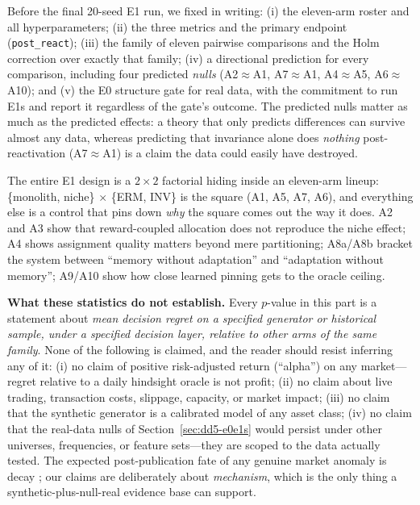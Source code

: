 Before the final 20-seed E1 run, we fixed in writing: (i) the eleven-arm
roster and all hyperparameters; (ii) the three metrics and the primary
endpoint (\texttt{post\_react}); (iii) the family of eleven pairwise
comparisons and the Holm correction over exactly that family; (iv) a
directional prediction for every comparison, including four predicted
\emph{nulls} (A2$\approx$A1, A7$\approx$A1, A4$\approx$A5,
A6$\approx$A10); and (v) the E0 structure gate for real data, with the
commitment to run E1s and report it regardless of the gate's outcome. The
predicted nulls matter as much as the predicted effects: a theory that only
predicts differences can survive almost any data, whereas predicting that
invariance alone does \emph{nothing} post-reactivation (A7$\approx$A1) is a
claim the data could easily have destroyed.

\begin{intuition}
The entire E1 design is a $2\times 2$ factorial hiding inside an eleven-arm
lineup: \{monolith, niche\} $\times$ \{ERM, INV\} is the square
(A1, A5, A7, A6), and everything else is a control that pins down \emph{why}
the square comes out the way it does. A2 and A3 show that reward-coupled
allocation does not reproduce the niche effect; A4 shows assignment quality
matters beyond mere partitioning; A8a/A8b bracket the system between
``memory without adaptation'' and ``adaptation without memory''; A9/A10 show
how close learned pinning gets to the oracle ceiling.
\end{intuition}

\begin{warning}
\textbf{What these statistics do not establish.} Every $p$-value in this
part is a statement about \emph{mean decision regret on a specified
generator or historical sample, under a specified decision layer, relative
to other arms of the same family}. None of the following is claimed, and the
reader should resist inferring any of it: (i) no claim of positive risk-adjusted
return (``alpha'') on any market---regret relative to a daily hindsight
oracle is not profit; (ii) no claim about live trading, transaction costs,
slippage, capacity, or market impact; (iii) no claim that the synthetic
generator is a calibrated model of any asset class; (iv) no claim that the
real-data nulls of Section~\ref{sec:dd5-e0e1s} would persist under other
universes, frequencies, or feature sets---they are scoped to the data
actually tested. The expected post-publication fate of any genuine
market anomaly is decay \citep{mclean2016does}; our claims are deliberately
about \emph{mechanism}, which is the only thing a synthetic-plus-null-real
evidence base can support.
\end{warning}

